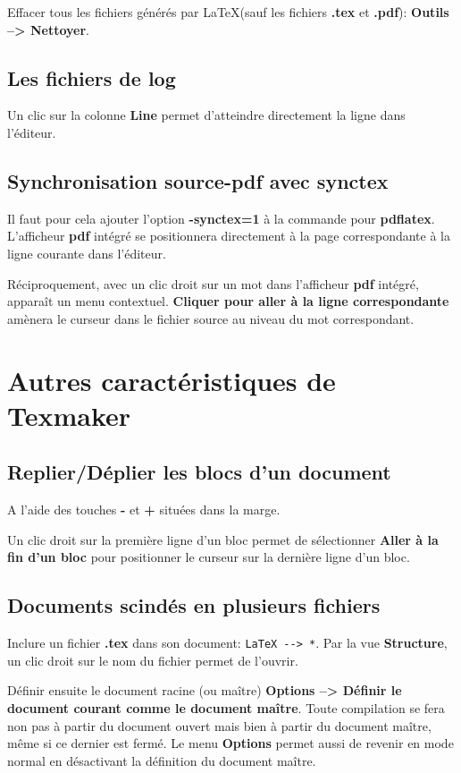 \documentclass[a4paper,11pt]{article}
\begin{document}
Effacer tous les fichiers générés par \LaTeX (sauf les fichiers \textbf{.tex} et \textbf{.pdf}): \textbf{Outils --> Nettoyer}.

\subsection*{Les fichiers de \textbf{log}}
Un clic sur la colonne \textbf{Line} permet d'atteindre directement la ligne dans l'éditeur.

\subsection*{Synchronisation \textbf{source-pdf} avec \textbf{synctex}}
Il faut pour cela ajouter l'option \textbf{\og -synctex=1\fg{}} à la commande pour \textbf{pdflatex}. L'afficheur \textbf{pdf} intégré se positionnera directement à la page correspondante à la ligne courante dans l'éditeur.

Réciproquement, avec un clic droit sur un mot dans l'afficheur \textbf{pdf} intégré, apparaît un menu contextuel. \textbf{Cliquer pour aller à la ligne correspondante} amènera le curseur dans le fichier source au niveau du mot correspondant.

\section{Autres caractéristiques de \textbf{Texmaker}}
\subsection*{Replier/Déplier les blocs d'un document}
A l'aide des touches \textbf{-} et \textbf{+} situées dans la marge.

Un clic droit sur la première ligne d'un bloc permet de sélectionner \textbf{Aller à la fin d'un bloc} pour positionner le curseur sur la dernière ligne d'un bloc.

\subsection*{Documents scindés en plusieurs fichiers}
Inclure un fichier \textbf{.tex} dans son document: \verb|LaTeX --> *|. Par la vue \textbf{Structure}, un clic droit sur le nom du fichier permet de l'ouvrir.

Définir ensuite le document racine (ou maître) \textbf{Options --> Définir le document courant comme le document \og maître\fg{}}. Toute compilation se fera non pas à partir du document ouvert mais bien à partir du document maître, même si ce dernier est fermé. Le menu \textbf{Options} permet aussi de revenir en mode \og normal\fg{} en désactivant la définition du document maître.
\end{document}
